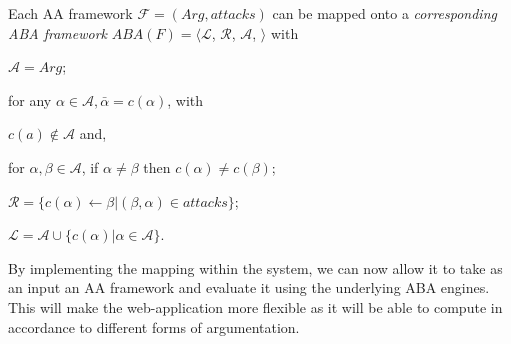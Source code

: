 \begin{defn} Each AA framework $\mathcal{F} = (Arg, attacks)$ can be mapped onto a \emph{corresponding ABA framework} $ ABA(F) = \langle\mathcal{L}$, $\mathcal{R}$, $\mathcal{A}$, {\bf\textasciimacron} $\rangle$ with

\begin{itemize*}
\item $\mathcal{A} = Arg$;
\item for any $\alpha \in \mathcal{A}, \bar{\alpha} = c(\alpha)$, with
\begin{itemize*}
\item $c(a) \notin \mathcal{A}$ and,
\item for $\alpha, \beta \in \mathcal{A}$, if $\alpha \neq \beta$ then $c(\alpha) \neq c(\beta)$;
\end{itemize*}
\item $\mathcal{R} = \{c(\alpha) \leftarrow \beta | (\beta	,\alpha) \in attacks\}$;
\item $\mathcal{L} = \mathcal{A} \cup \{c(\alpha) | \alpha \in \mathcal{A}\}$.
\end{itemize*}

\end{defn}

By implementing the mapping within the system, we can now allow it to take as an input an AA framework and evaluate it using the underlying ABA engines. This will make the web-application more flexible as it will be able to compute in accordance to different forms of argumentation.


